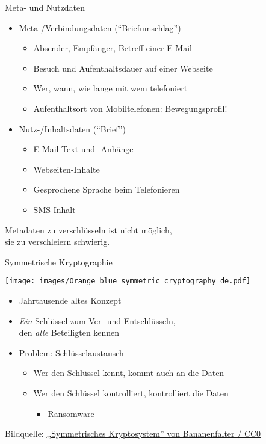 \begin{frame}{Meta- und Nutzdaten}
  \begin{itemize}
    \item Meta-/Verbindungsdaten (``Briefumschlag'')
    \begin{itemize}
      \item Absender, Empfänger, Betreff einer E-Mail
      \item Besuch und Aufenthaltsdauer auf einer Webseite
      \item Wer, wann, wie lange mit wem telefoniert
      \item Aufenthaltsort von Mobiltelefonen: Bewegungsprofil!
    \end{itemize}
    \item Nutz-/Inhaltsdaten (``Brief'')
    \begin{itemize}
      \item E-Mail-Text und -Anhänge
      \item Webseiten-Inhalte
      \item Gesprochene Sprache beim Telefonieren
      \item SMS-Inhalt
    \end{itemize}
  \end{itemize}

Metadaten zu verschlüsseln ist nicht möglich,\\ sie zu verschleiern schwierig.
\end{frame}

\begin{frame}{Symmetrische Kryptographie}
  \begin{center}
    \texttt{[image: images/Orange\_blue\_symmetric\_cryptography\_de.pdf]}
  \end{center}
  \begin{itemize}
    \item Jahrtausende altes Konzept
    \item \emph{Ein} Schlüssel zum Ver- und Entschlüsseln,\\den \emph{alle} Beteiligten kennen
    \item Problem: Schlüsselaustausch
    \begin{itemize}
      \item Wer den Schlüssel kennt, kommt auch an die Daten
      \item Wer den Schlüssel kontrolliert, kontrolliert die Daten
      \begin{itemize}
        \item Ransomware
      \end{itemize}
    \end{itemize}
  \end{itemize}
  \tiny Bildquelle: \href{https://de.wikipedia.org/wiki/Datei:Orange_blue_symmetric_cryptography_de.svg}{,,Symmetrisches Kryptosystem'' von Bananenfalter / CC0}
\end{frame}

